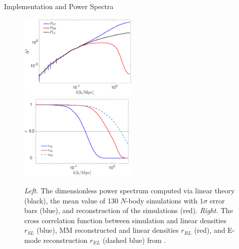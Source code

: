 \begin{section}{Implementation and Power Spectra}
  \begin{figure}
    \centering
    \includegraphics[width=0.5\textwidth]{fig2a.pdf}
    \includegraphics[width=0.49\textwidth]{fig2b.pdf}
    \caption{{\it Left.} The dimensionless power spectrum computed via
      linear theory (black), the mean value of 130 $N$-body
      simulations with $1\sigma$ error bars (blue), and reconstruction
      of the simulations (red).  {\it Right.} The cross correlation
      function between simulation and linear densities $r_{SL}$ (blue),
      MM reconstructed and linear densities $r_{RL}$ (red), and E-mode reconstruction $r_{EL}$ (dashed
      blue) from \citet{bib:Yu2016}.}
    \label{fig:cp}
  \end{figure}


\end{section}

